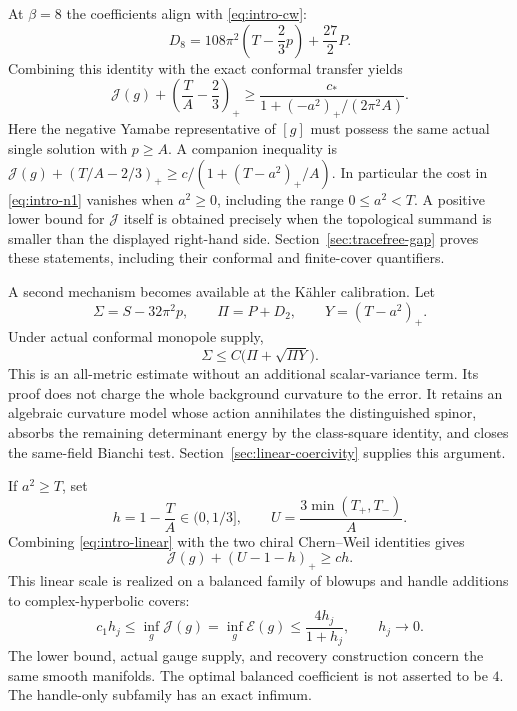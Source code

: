\documentclass[10pt,a4paper]{article}
\theoremstyle{definition}
\theoremstyle{remark}
\numberwithin{equation}{section}
\providecommand{\E}{\mathcal E}
\providecommand{\J}{\mathcal J}
\begin{document}
At $\beta=8$ the coefficients align with \eqref{eq:intro-cw}:
\[
 D_8=108\pi^2\left(T-\frac23p\right)+\frac{27}{2}P.
\]
Combining this identity with the exact conformal transfer yields
\begin{equation}\label{eq:intro-n1}
 \J(g)+\left(\frac TA-\frac23\right)_+
 \ge\frac{c_*}{1+(-a^2)_+/(2\pi^2A)}.
\end{equation}
Here the negative Yamabe representative of $[g]$ must possess the same
actual single solution with $p\ge A$. A companion inequality is
$\J(g)+(T/A-2/3)_+\ge c/(1+(T-a^2)_+/A)$. In particular the
cost in \eqref{eq:intro-n1} vanishes when $a^2\ge0$, including the
range $0\le a^2<T$. A positive lower bound for $\J$ itself is obtained
precisely when the topological summand is smaller than the displayed
right-hand side. Section~\ref{sec:tracefree-gap} proves these statements,
including their conformal and finite-cover quantifiers.

A second mechanism becomes available at the Kähler calibration. Let
\[
 \Sigma=S-32\pi^2p,\qquad \Pi=P+D_2,
 \qquad Y=(T-a^2)_+.
\]
Under actual conformal monopole supply,
\begin{equation}\label{eq:intro-linear}
 \Sigma\le C\bigl(\Pi+\sqrt{\Pi Y}\bigr).
\end{equation}
This is an all-metric estimate without an additional scalar-variance
term. Its proof does not charge the whole background curvature to the
error. It retains an algebraic curvature model whose action annihilates
the distinguished spinor, absorbs the remaining determinant energy by
the class-square identity, and closes the same-field Bianchi test.
Section~\ref{sec:linear-coercivity} supplies this argument.

If $a^2\ge T$, set
\[
 h=1-\frac TA\in(0,1/3],\qquad
 U=\frac{3\min(T_+,T_-)}{A}.
\]
Combining \eqref{eq:intro-linear} with the two chiral Chern--Weil
identities gives
\begin{equation}\label{eq:intro-window}
 \J(g)+(U-1-h)_+\ge ch.
\end{equation}
This linear scale is realized on a balanced family of blowups and
handle additions to complex-hyperbolic covers:
\[
 c_1h_j\le\inf_g\J(g)=\inf_g\E(g)
      \le\frac{4h_j}{1+h_j},\qquad h_j\longrightarrow0.
\]
The lower bound, actual gauge supply, and recovery construction concern
the same smooth manifolds. The optimal balanced coefficient is not
asserted to be $4$. The handle-only subfamily has an exact infimum.
\end{document}

